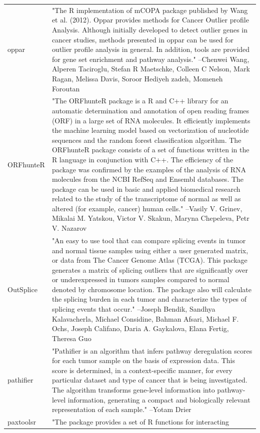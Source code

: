 \documentclass[]{article}
\begin{document}
\begin{longtable}[t]{l>{\raggedright\arraybackslash}p{25em}}
oppar & "The R implementation of mCOPA package published by Wang et
al. (2012). Oppar provides methods for Cancer Outlier profile
Analysis. Although initially developed to detect outlier genes
in cancer studies, methods presented in oppar can be used for
outlier profile analysis in general. In addition, tools are
provided for gene set enrichment and pathway analysis." --Chenwei Wang, Alperen Taciroglu, Stefan R Maetschke, Colleen C Nelson, Mark Ragan, Melissa Davis, Soroor Hediyeh zadeh, Momeneh Foroutan\\
ORFhunteR & "The ORFhunteR package is a R and C++ library for an
automatic determination and annotation of open reading frames
(ORF) in a large set of RNA molecules. It efficiently
implements the machine learning model based on vectorization of
nucleotide sequences and the random forest classification
algorithm. The ORFhunteR package consists of a set of functions
written in the R language in conjunction with C++. The
efficiency of the package was confirmed by the examples of the
analysis of RNA molecules from the NCBI RefSeq and Ensembl
databases. The package can be used in basic and applied
biomedical research related to the study of the transcriptome
of normal as well as altered (for example, cancer) human cells." --Vasily V. Grinev, Mikalai M. Yatskou, Victor V. Skakun, Maryna Chepeleva, Petr V. Nazarov\\
OutSplice & "An easy to use tool that can compare splicing events in
tumor and normal tissue samples using either a user generated
matrix, or data from The Cancer Genome Atlas (TCGA). This
package generates a matrix of splicing outliers that are
significantly over or underexpressed in tumors samples compared
to normal denoted by chromosome location. The package also will
calculate the splicing burden in each tumor and characterize
the types of splicing events that occur." --Joseph Bendik, Sandhya Kalavacherla, Michael Considine, Bahman Afsari, Michael F. Ochs, Joseph Califano, Daria A. Gaykalova, Elana Fertig, Theresa Guo\\
\addlinespace
pathifier & "Pathifier is an algorithm that infers pathway deregulation
scores for each tumor sample on the basis of expression data.
This score is determined, in a context-specific manner, for
every particular dataset and type of cancer that is being
investigated. The algorithm transforms gene-level information
into pathway-level information, generating a compact and
biologically relevant representation of each sample." --Yotam Drier\\
paxtoolsr & "The package provides a set of R functions for interacting

\end{longtable}
\end{document}
